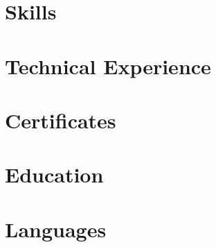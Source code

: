 \documentclass[10pt]{article}
\begin{document}
\pagestyle{others}\thispagestyle{first_page}



\section{Skills}


\section{Technical Experience}


% 

\section{Certificates}



\section{Education}


\section{Languages}

\end{document}

